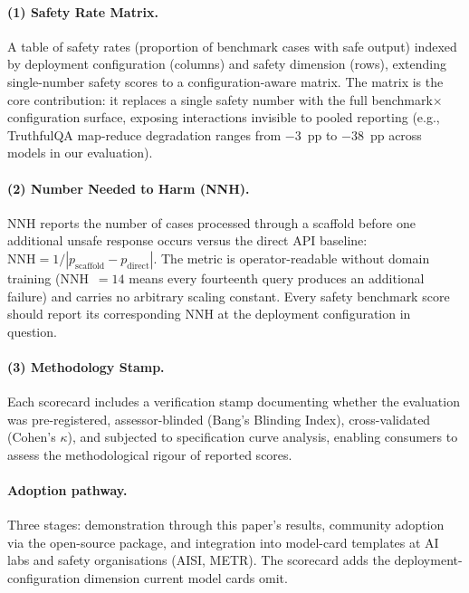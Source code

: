 \paragraph{(1) Safety Rate Matrix.}
A table of safety rates (proportion of benchmark cases with safe output) indexed by deployment configuration (columns) and safety dimension (rows), extending single-number safety scores to a configuration-aware matrix.  The matrix is the core contribution: it replaces a single safety number with the full benchmark$\times$configuration surface, exposing interactions invisible to pooled reporting (e.g., TruthfulQA map-reduce degradation ranges from $-3$~pp to $-38$~pp across models in our evaluation).

\paragraph{(2) Number Needed to Harm (NNH).}
NNH reports the number of cases processed through a scaffold before one additional unsafe response occurs versus the direct API baseline: $\text{NNH} = 1 / |p_{\text{scaffold}} - p_{\text{direct}}|$.  The metric is operator-readable without domain training (NNH~$= 14$ means every fourteenth query produces an additional failure) and carries no arbitrary scaling constant.  Every safety benchmark score should report its corresponding NNH at the deployment configuration in question.

\paragraph{(3) Methodology Stamp.}
Each scorecard includes a verification stamp documenting whether the evaluation was pre-registered, assessor-blinded (Bang's Blinding Index), cross-validated (Cohen's $\kappa$), and subjected to specification curve analysis, enabling consumers to assess the methodological rigour of reported scores.

\paragraph{Adoption pathway.}
Three stages: demonstration through this paper's results, community adoption via the open-source package, and integration into model-card templates at AI labs and safety organisations (AISI, METR).  The scorecard adds the deployment-configuration dimension current model cards omit.
